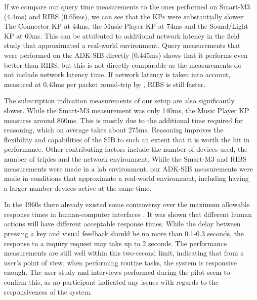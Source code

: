 
If we compare our query time measurements to the ones performed on Smart-M3 (4.4ms) and \ac{RIBS} (0.65ms), we can see that the \acp{KP} were substantially slower: The Connector \ac{KP} at 44ms, the Music Player \ac{KP} at 74ms and the Sound/Light \ac{KP} at 60ms. This can be attributed to additional network latency in the field study that approximated a real-world environment. Query measurements that were performed on the ADK-SIB directly (0.445ms) shows that it performs even better than \ac{RIBS}, but this is not directly comparable as the measurements do not include network latency time. If network latency is taken into account, measured at 0.43ms per packet round-trip by \cite{Etelapera2011}, \ac{RIBS} is still faster.

The subscription indication measurements of our setup are also significantly slower. While the Smart-M3 measurement was only 140ms, the Music Player \ac{KP} measures around 860ms. This is mostly due to the additional time required for reasoning, which on average takes about 275ms. Reasoning improves the flexibility and capabilities of the \ac{SIB} to such an extent that it is worth the hit in performance. Other contributing factors include the number of devices used, the number of triples and the network environment. While the Smart-M3 and \ac{RIBS} measurements were made in a lab environment, our ADK-SIB measurements were made in conditions that approximate a real-world environment, including having a larger number devices active at the same time.

In the 1960s there already existed some controversy over the maximum allowable response times in human-computer interfaces \cite{Miller1968}. It was shown that different human actions will have different acceptable response times. While the delay between pressing a key and visual feedback should be no more than 0.1-0.3 seconds, the response to a inquiry request may take up to 2 seconds. The performance measurements are still well within this two-second limit, indicating that from a user's point of view, when performing routine tasks, the system is responsive enough. The user study and interviews performed during the pilot seem to confirm this, as no participant indicated any issues with regards to the responsiveness of the system.

